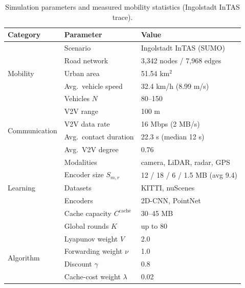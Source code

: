 \begin{table}[t]
\centering
\caption{Simulation parameters and measured mobility statistics
(Ingolstadt InTAS trace).}
\label{tab:setup}
\setlength{\tabcolsep}{4pt}
\begin{tabular}{lll}
\toprule
Category & Parameter & Value \\
\midrule
\multirow{5}{*}{Mobility}
 & Scenario              & Ingolstadt InTAS (SUMO) \\
 & Road network          & 3{,}342 nodes / 7{,}968 edges \\
 & Urban area            & 51.54 km$^2$ \\
 & Avg.\ vehicle speed   & 32.4 km/h (8.99 m/s) \\
 & Vehicles $N$          & 80--150 \\
\midrule
\multirow{4}{*}{Communication}
 & V2V range             & 100 m \\
 & V2V data rate         & 16 Mbps (2 MB/s) \\
 & Avg.\ contact duration & 22.3 s (median 12 s) \\
 & Avg.\ V2V degree      & 0.76 \\
\midrule
\multirow{5}{*}{Learning}
 & Modalities            & camera, LiDAR, radar, GPS \\
 & Encoder size $S_{m,r}$ & 12 / 18 / 6 / 1.5 MB (avg 9.4) \\
 & Datasets              & KITTI, nuScenes \\
 & Encoders              & 2D-CNN, PointNet \\
 & Cache capacity $C^{\mathrm{cache}}$ & 30--45 MB \\
 & Global rounds $K$     & up to 80 \\
\midrule
\multirow{4}{*}{Algorithm}
 & Lyapunov weight $V$   & 2.0 \\
 & Forwarding weight $\nu$ & 1.0 \\
 & Discount $\gamma$     & 0.8 \\
 & Cache-cost weight $\lambda$ & 0.02 \\
\bottomrule
\end{tabular}
\end{table}

